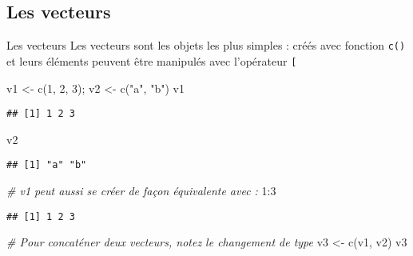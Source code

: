 \documentclass[10pt,xcolor=table,color={dvipsnames,usenames},ignorenonframetext,usepdftitle=false,french]{beamer}
\newenvironment{Shaded}{\begin{snugshade}}{\end{snugshade}}
\newcommand{\CommentTok}[1]{\textcolor[rgb]{0.56,0.35,0.01}{\textit{#1}}}
\newcommand{\DecValTok}[1]{\textcolor[rgb]{0.00,0.00,0.81}{#1}}
\newcommand{\FunctionTok}[1]{\textcolor[rgb]{0.00,0.00,0.00}{#1}}
\newcommand{\NormalTok}[1]{#1}
\newcommand{\OtherTok}[1]{\textcolor[rgb]{0.56,0.35,0.01}{#1}}
\newcommand{\SpecialCharTok}[1]{\textcolor[rgb]{0.00,0.00,0.00}{#1}}
\newcommand{\StringTok}[1]{\textcolor[rgb]{0.31,0.60,0.02}{#1}}
\begin{document}
\hypertarget{les-vecteurs}{%
\subsection{Les vecteurs}\label{les-vecteurs}}

\begin{frame}{Les vecteurs}
\protect\hypertarget{les-vecteurs-1}{}
Les vecteurs sont les objets les plus simples : créés avec fonction
\texttt{c()} et leurs éléments peuvent être manipulés avec l'opérateur
\texttt{{[}}

\begin{Shaded}
\begin{Highlighting}[]
\NormalTok{v1 }\OtherTok{\textless{}{-}} \FunctionTok{c}\NormalTok{(}\DecValTok{1}\NormalTok{, }\DecValTok{2}\NormalTok{, }\DecValTok{3}\NormalTok{); v2 }\OtherTok{\textless{}{-}} \FunctionTok{c}\NormalTok{(}\StringTok{"a"}\NormalTok{, }\StringTok{"b"}\NormalTok{)}
\NormalTok{v1}
\end{Highlighting}
\end{Shaded}

\begin{verbatim}
## [1] 1 2 3
\end{verbatim}

\begin{Shaded}
\begin{Highlighting}[]
\NormalTok{v2}
\end{Highlighting}
\end{Shaded}

\begin{verbatim}
## [1] "a" "b"
\end{verbatim}

\begin{Shaded}
\begin{Highlighting}[]
\CommentTok{\# v1 peut aussi se créer de façon équivalente avec :}
\DecValTok{1}\SpecialCharTok{:}\DecValTok{3}
\end{Highlighting}
\end{Shaded}

\begin{verbatim}
## [1] 1 2 3
\end{verbatim}

\begin{Shaded}
\begin{Highlighting}[]
\CommentTok{\# Pour concaténer deux vecteurs, notez le changement de type}
\NormalTok{v3 }\OtherTok{\textless{}{-}} \FunctionTok{c}\NormalTok{(v1, v2)}
\NormalTok{v3}
\end{Highlighting}
\end{Shaded}


\end{frame}
\end{document}
